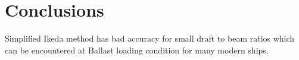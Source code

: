 \section{Conclusions}
\label{se:conclusions}
Simplified Ikeda method has bad accuracy for small draft to beam ratios which can be encountered at Ballast loading condition for many modern ships.